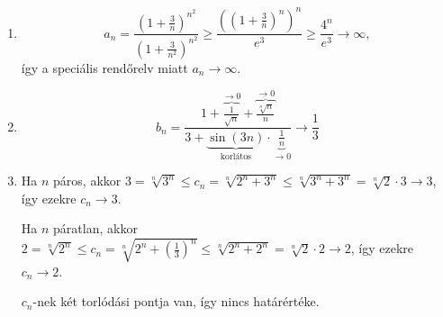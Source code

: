 \documentclass[11pt]{scrartcl}
\begin{document}
\begin{enumerate}
	\item \[
		      a_n
		      = \frac{\left(1 + \frac{3}{n}\right)^{n^2}}{\left(1 + \frac{3}{n^2}\right)^{n^2}}
		      \ge \frac{\left(\left(1 + \frac{3}{n}\right)^n\right)^n}{e^3}
		      \ge \frac{4^n}{e^3}
		      \to \infty,
	      \]
	      így a speciális rendőrelv miatt $a_n \to \infty$.

	\item \[
		      b_n
		      = \frac{
			      1 + \overbrace{\frac{1}{\sqrt{n}}}^{\to 0} + \overbrace{\frac{\sqrt[n]{n}}{n}}^{\to 0}
		      }{
			      3 + \underbrace{\sin(3n)}_{\text{korlátos}} \cdot \underbrace{\frac{1}{n}}_{\to 0}
		      }
		      \to \frac{1}{3}
	      \]

	\item Ha $n$ páros, akkor
	      \(
	      3 = \sqrt[n]{3^n} \le c_n = \sqrt[n]{2^n + 3^n} \le \sqrt[n]{3^n + 3^n}
	      = \sqrt[n]{2} \cdot 3 \to 3
	      \),
	      így ezekre $c_n \to 3$.

	      Ha $n$ páratlan, akkor
	      \(
	      2 = \sqrt[n]{2^n}
	      \le c_n = \sqrt[n]{2^n + \left(\frac{1}{3}\right)^n}
	      \le \sqrt[n]{2^n + 2^n} = \sqrt[n]{2} \cdot 2 \to 2
	      \),
	      így ezekre $c_n \to 2$.

	      $c_n$-nek két torlódási pontja van, így nincs határértéke.
\end{enumerate}
\end{document}
